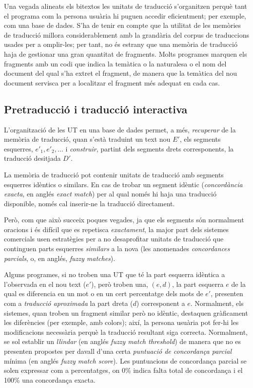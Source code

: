 Una vegada alineats els bitextos les unitats de traducció s'organitzen
perquè tant el programa com la persona usuària hi puguen accedir
eficientment; per exemple, com una base de dades. S'ha de tenir en
compte que la utilitat de les memòries de traducció millora
considerablement amb la grandària del corpus de traduccions usades per
a omplir-les; per tant, no és estrany que una memòria de traducció
haja de gestionar una gran quantitat de fragments. Molts programes
marquen els fragments amb un codi que indica la temàtica o la
naturalesa o el nom del document del qual s'ha extret el fragment, de manera
que la temàtica del nou document servisca per a localitzar el fragment
més adequat en cada cas.

\subsection{Pretraducció i traducció interactiva}

L'organització de les UT en una base de dades permet, a més,
\emph{recuperar} de la memòria de traducció, quan s'està traduint un
text nou $E'$, els segments esquerres, $e'_1, e'_2, \ldots$ i
\emph{construir}, partint dels segments drets corresponents, la
traducció desitjada $D'$.

La memòria de traducció pot contenir unitats de traducció amb segments
esquerres idèntics o similars. En cas de trobar un segment idèntic
(\emph{concordància exacta}, en anglés \emph{exact match}) per al qual
només hi haja una traducció disponible, només cal inserir-ne la
traducció directament.


Però, com que això succeix poques vegades, ja que els segments són
normalment oracions i és difícil que es repetisca \emph{exactament},
la major part dels sistemes comercials usen estratègies per a no
desaprofitar unitats de traducció que continguen parts esquerres
\emph{similars} a la nova (les anomenades \emph{concordances
  parcials}, o, en anglés, \emph{fuzzy matches}). 


Alguns programes, si no troben una UT que té la part esquerra idèntica
a l'observada en el nou text ($e'$), però troben una, $(e,d)$, la part
esquerra $e$ de la qual es diferencia en un mot o en un cert
percentatge dels mots de $e'$, presenten com a \emph{traducció
  aproximada} la part dreta ($d$) corresponent a $e$.  Normalment, els
sistemes, quan troben un fragment similar però no idèntic, destaquen
gràficament les diferències (per exemple, amb colors); així, la
persona usuària pot fer-hi les modificacions necessària perquè la
traducció resultant siga correcta. Normalment, se sol establir un
\emph{llindar} (en anglés \emph{fuzzy match threshold}) de manera que
no es presenten propostes per davall d'una certa \emph{puntuació de
  concordança parcial} mínima (en anglés \emph{fuzzy match
  score}). Les puntuacions de concordança parcial se solen expressar
com a percentatges, on 0\% indica falta total de concordança i el
100\% una concordança exacta.


